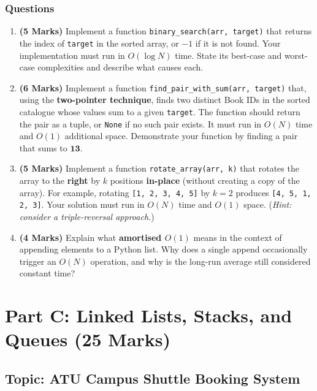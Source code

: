 \documentclass[11pt,a4paper]{article}
\begin{document}
\subsubsection*{Questions}
\begin{enumerate}[label=\textbf{B\arabic*.}]
    \item \textbf{(5 Marks)} Implement a function \texttt{binary\_search(arr, target)} that returns the index of \texttt{target} in the sorted array, or $-1$ if it is not found. Your implementation must run in $O(\log N)$ time. State its best-case and worst-case complexities and describe what causes each.

    \item \textbf{(6 Marks)} Implement a function \texttt{find\_pair\_with\_sum(arr, target)} that, using the \textbf{two-pointer technique}, finds two distinct Book IDs in the sorted catalogue whose values sum to a given \texttt{target}. The function should return the pair as a tuple, or \texttt{None} if no such pair exists. It must run in $O(N)$ time and $O(1)$ additional space. Demonstrate your function by finding a pair that sums to $\mathbf{13}$.

    \item \textbf{(5 Marks)} Implement a function \texttt{rotate\_array(arr, k)} that rotates the array to the \textbf{right} by $k$ positions \textbf{in-place} (without creating a copy of the array). For example, rotating \texttt{[1, 2, 3, 4, 5]} by $k = 2$ produces \texttt{[4, 5, 1, 2, 3]}. Your solution must run in $O(N)$ time and $O(1)$ space. (\textit{Hint: consider a triple-reversal approach.})

    \item \textbf{(4 Marks)} Explain what \textbf{amortised $O(1)$} means in the context of appending elements to a Python list. Why does a single append occasionally trigger an $O(N)$ operation, and why is the long-run average still considered constant time?
\end{enumerate}

\newpage

\section{Part C: Linked Lists, Stacks, and Queues (25 Marks)}
\subsection*{Topic: ATU Campus Shuttle Booking System}
\end{document}
